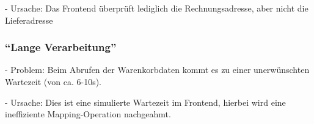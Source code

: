 - Ursache: Das Frontend überprüft lediglich die Rechnungsadresse, aber nicht die Lieferadresse

%
%

%
%

\subsubsection{\enquote{Lange Verarbeitung}}
\label{subsec:lange-verarbeitung}

- Problem: Beim Abrufen der Warenkorbdaten kommt es zu einer unerwünschten Wartezeit (von ca. 6-10s).

- Ursache: Dies ist eine simulierte Wartezeit im Frontend, hierbei wird eine ineffiziente Mapping-Operation nachgeahmt.

%
%

